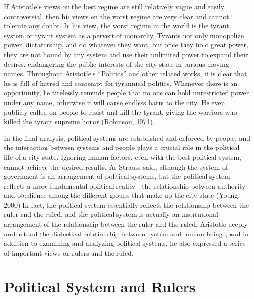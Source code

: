 \documentclass[11pt]{article}
\begin{document}
If Aristotle's views on the best regime are still relatively vague and easily controversial, then his views on the worst regime are very clear and cannot tolerate any doubt. In his view, the worst regime in the world is the tyrant system or tyrant system as a pervert of monarchy. Tyrants not only monopolize power, dictatorship, and do whatever they want, but once they hold great power, they are not bound by any system and use their unlimited power to expand their desires, endangering the public interests of the city-state in various moving names. Throughout Aristotle's “Politics” and other related works, it is clear that he is full of hatred and contempt for tyrannical politics. Whenever there is an opportunity, he tirelessly reminds people that no one can hold unrestricted power under any name, otherwise it will cause endless harm to the city. He even publicly called on people to resist and kill the tyrant, giving the warriors who killed the tyrant supreme honor (Robinson, 1971).

In the final analysis, political systems are established and enforced by people, and the interaction between systems and people plays a crucial role in the political life of a city-state. Ignoring human factors, even with the best political system, cannot achieve the desired results. As Strauss said, although the system of government is an arrangement of political systems, but the political system reflects a more fundamental political reality - the relationship between authority and obedience among the different groups that make up the city-state (Young, 2000) In fact, the political system essentially reflects the relationship between the ruler and the ruled, and the political system is actually an institutional arrangement of the relationship between the ruler and the ruled. Aristotle deeply understood the dialectical relationship between system and human beings, and in addition to examining and analyzing political systems, he also expressed a series of important views on rulers and the ruled.

\section{Political System and Rulers}
\end{document}
